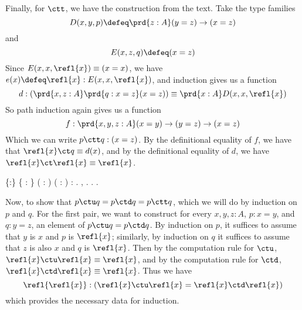 Finally, for $\ctt$, we have the construction from the text.  Take the type
families
\[
  D(x,y,p) \defeq 
  \prd{z:A}(y=z) \to  (x=z)
\]
and
\[
  E(x, z, q) \defeq (x = z)
\]
Since $E(x,x,\refl{x}) \equiv (x=x)$, we have $e(x) \defeq \refl{x} :
E(x,x,\refl{x})$, and induction gives us a function
\[
  d : \left(\prd{x,z:A}\prd{q:x=z}(x=z)\right) 
  \equiv
  \prd{x:A}D(x, x, \refl{x})
\]
So path induction again gives us a function
\[
  f : \prd{x,y,z:A}(x=y) \to(y=z) \to (x=z)
\]
Which we can write $p \ctt q : (x=z)$.  By the definitional equality of $f$, we
have that $\refl{x} \ct q \equiv d(x)$, and by the definitional equality of
$d$, we have $\refl{x} \ct \refl{x} \equiv \refl{x}$. \begin{coqdoccode}
\coqdocemptyline
\coqdocnoindent
{}  \{:\} \{   : \} ( :  \coqdocnotation{=} ) ( :  \coqdocnotation{=} ) :  \coqdocnotation{=} .\coqdoceol
\coqdocindent{1.00em}
 , . .\coqdoceol
\coqdocnoindent
{}.\coqdoceol
\coqdocemptyline
\end{coqdoccode}
Now, to show that $p \ctu q = p \ctd q = p \ctt q$, which we will do by
induction on $p$ and $q$.  For the first pair, we want to construct for every
$x, y, z : A$, $p : x = y$, and $q : y = z$, an element of $p \ctu q = p \ctd
q$.  By induction on $p$, it suffices to assume that $y$ is $x$ and $p$ is
$\refl{x}$; similarly, by induction on $q$ it suffices to assume that $z$ is
also $x$ and $q$ is $\refl{x}$.  Then by the computation rule for $\ctu$,
$\refl{x} \ctu \refl{x} \equiv \refl{x}$, and by the computation rule for
$\ctd$, $\refl{x} \ctd \refl{x} \equiv \refl{x}$.  Thus we have
\[
  \refl{\refl{x}} : (\refl{x} \ctu \refl{x} = \refl{x} \ctd \refl{x})
\]
which provides the necessary data for induction.


